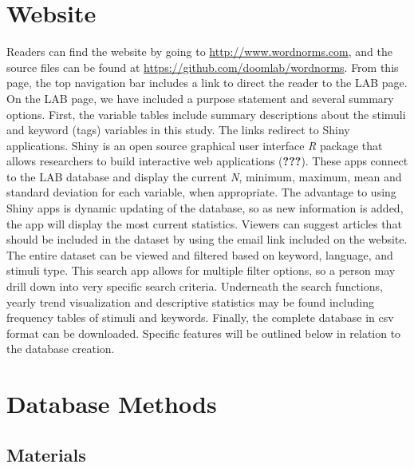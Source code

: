 \documentclass[english,man]{apa6}
\theoremstyle{definition}
\theoremstyle{definition}
\theoremstyle{definition}
\theoremstyle{remark}
\begin{document}
\section{Website}\label{website}

Readers can find the website by going to \url{http://www.wordnorms.com},
and the source files can be found at
\url{https://github.com/doomlab/wordnorms}. From this page, the top
navigation bar includes a link to direct the reader to the LAB page. On
the LAB page, we have included a purpose statement and several summary
options. First, the variable tables include summary descriptions about
the stimuli and keyword (tags) variables in this study. The links
redirect to Shiny applications. Shiny is an open source graphical user
interface \emph{R} package that allows researchers to build interactive
web applications ({\textbf{???}}). These apps connect to the LAB
database and display the current \emph{N}, minimum, maximum, mean and
standard deviation for each variable, when appropriate. The advantage to
using Shiny apps is dynamic updating of the database, so as new
information is added, the app will display the most current statistics.
Viewers can suggest articles that should be included in the dataset by
using the email link included on the website. The entire dataset can be
viewed and filtered based on keyword, language, and stimuli type. This
search app allows for multiple filter options, so a person may drill
down into very specific search criteria. Underneath the search
functions, yearly trend visualization and descriptive statistics may be
found including frequency tables of stimuli and keywords. Finally, the
complete database in csv format can be downloaded. Specific features
will be outlined below in relation to the database creation.

\section{Database Methods}\label{database-methods}

\subsection{Materials}\label{materials}
\end{document}
